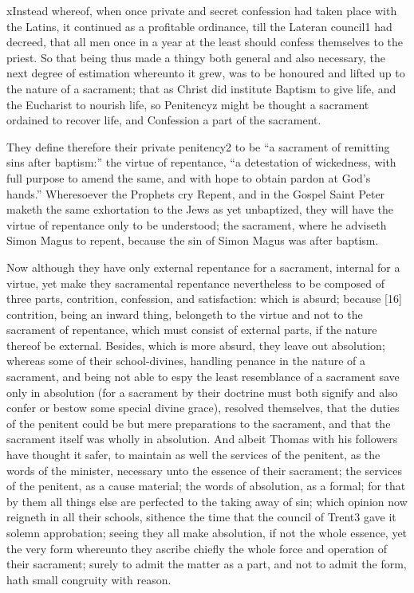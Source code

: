 xInstead whereof, when once private and secret confession had taken place with the Latins, it continued as a profitable ordinance, till the Lateran council1 had decreed, that all men once in a year at the least should confess themselves to the priest. So that being thus made a thingy both general and also necessary, the next degree of estimation whereunto it grew, was to be honoured and lifted up to the nature of a sacrament; that as Christ did institute Baptism to give life, and the Eucharist to nourish life, so Penitencyz might be thought a sacrament ordained to recover life, and Confession a part of the sacrament.

They define therefore their private penitency2 to be “a sacrament of remitting sins after baptism:” the virtue of repentance, “a detestation of wickedness, with full purpose to amend the same, and with hope to obtain pardon at God’s hands.” Wheresoever the Prophets cry Repent, and in the Gospel Saint Peter maketh the same exhortation to the Jews as yet unbaptized, they will have the virtue of repentance only to be understood; the sacrament, where he adviseth Simon Magus to repent, because the sin of Simon Magus was after baptism.

Now although they have only external repentance for a sacrament, internal for a virtue, yet make they sacramental repentance nevertheless to be composed of three parts, contrition, confession, and satisfaction: which is absurd; because [16] contrition, being an inward thing, belongeth to the virtue and not to the sacrament of repentance, which must consist of external parts, if the nature thereof be external. Besides, which is more absurd, they leave out absolution; whereas some of their school-divines, handling penance in the nature of a sacrament, and being not able to espy the least resemblance of a sacrament save only in absolution (for a sacrament by their doctrine must both signify and also confer or bestow some special divine grace), resolved themselves, that the duties of the penitent could be but mere preparations to the sacrament, and that the sacrament itself was wholly in absolution. And albeit Thomas with his followers have thought it safer, to maintain as well the services of the penitent, as the words of the minister, necessary unto the essence of their sacrament; the services of the penitent, as a cause material; the words of absolution, as a formal; for that by them all things else are perfected to the taking away of sin; which opinion now reigneth in all their schools, sithence the time that the council of Trent3 gave it solemn approbation; seeing they all make absolution, if not the whole essence, yet the very form whereunto they ascribe chiefly the whole force and operation of their sacrament; surely to admit the matter as a part, and not to admit the form, hath small congruity with reason.

